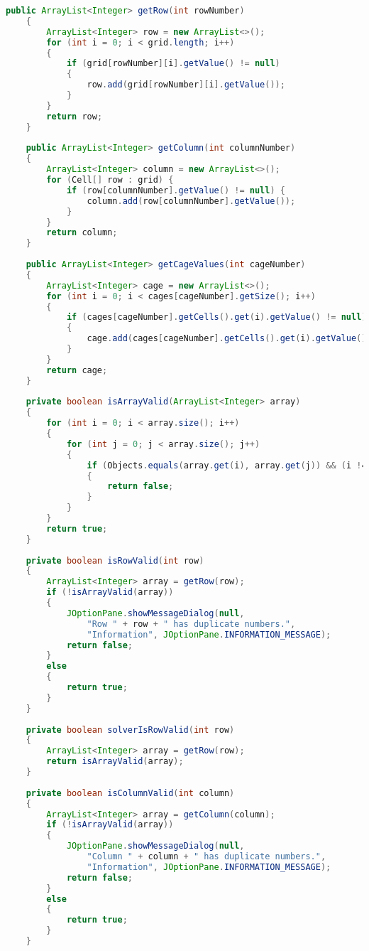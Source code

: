 \begin{lstlisting}[language=Java,basicstyle=\tiny,caption=Grid.java]
    public ArrayList<Integer> getRow(int rowNumber)
    {
        ArrayList<Integer> row = new ArrayList<>();
        for (int i = 0; i < grid.length; i++)
        {
            if (grid[rowNumber][i].getValue() != null)
            {
                row.add(grid[rowNumber][i].getValue());
            }
        }
        return row;
    }
    
    public ArrayList<Integer> getColumn(int columnNumber)
    {
        ArrayList<Integer> column = new ArrayList<>();
        for (Cell[] row : grid) {
            if (row[columnNumber].getValue() != null) {
                column.add(row[columnNumber].getValue());
            }
        }
        return column;
    }
    
    public ArrayList<Integer> getCageValues(int cageNumber)
    {
        ArrayList<Integer> cage = new ArrayList<>();
        for (int i = 0; i < cages[cageNumber].getSize(); i++)
        {
            if (cages[cageNumber].getCells().get(i).getValue() != null)
            {
                cage.add(cages[cageNumber].getCells().get(i).getValue());
            }
        }
        return cage;
    }
    
    private boolean isArrayValid(ArrayList<Integer> array)
    {
        for (int i = 0; i < array.size(); i++)
        {
            for (int j = 0; j < array.size(); j++)
            {
                if (Objects.equals(array.get(i), array.get(j)) && (i != j))
                {
                    return false;
                }
            }
        }
        return true;
    }
    
    private boolean isRowValid(int row)
    {
        ArrayList<Integer> array = getRow(row);
        if (!isArrayValid(array))
        {
            JOptionPane.showMessageDialog(null, 
                "Row " + row + " has duplicate numbers.",
                "Information", JOptionPane.INFORMATION_MESSAGE);
            return false;
        }
        else
        {
            return true;
        }
    }
    
    private boolean solverIsRowValid(int row)
    {
        ArrayList<Integer> array = getRow(row);
        return isArrayValid(array);
    }
    
    private boolean isColumnValid(int column)
    {
        ArrayList<Integer> array = getColumn(column);
        if (!isArrayValid(array))
        {
            JOptionPane.showMessageDialog(null, 
                "Column " + column + " has duplicate numbers.",
                "Information", JOptionPane.INFORMATION_MESSAGE);
            return false;
        }
        else
        {
            return true;
        }
    }
    

\end{lstlisting}
